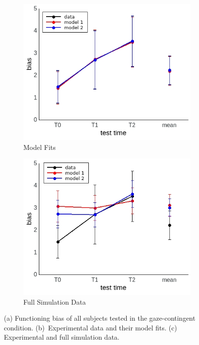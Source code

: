 \documentclass[a4paper]{scrreprt}
\begin{document}
\begin{figure}
    \begin{subfigure}[b]{0.49\textwidth}
        \includegraphics[width=\textwidth]{figs/sec3/fitting/fitting_reduced.jpeg}
        \caption{Model Fits}
    \end{subfigure}
\begin{subfigure}[b]{0.49\textwidth}
        \includegraphics[width=\textwidth]{figs/sec3/fitting/fitting_all.jpeg}
        \caption{Full Simulation Data}
    \end{subfigure}
\caption{(a) Functioning bias of all subjects tested in the gaze-contingent condition. (b)~Experimental data and their model fits. (c) Experimental and full simulation data.}
\label{fig:bias}
\end{figure}
\end{document}
